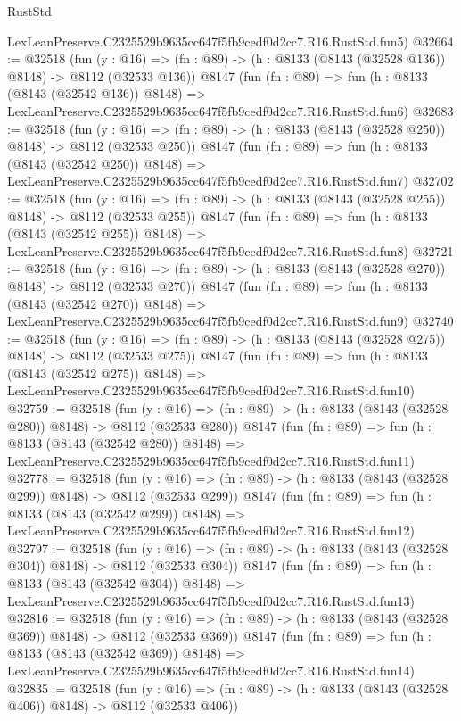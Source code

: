 \begin{lexlean}{RustStd}
\begin{coremodule}
    LexLeanPreserve.C2325529b9635cc647f5fb9cedf0d2cc7.R16.RustStd.fun5)
@32664 := @32518
    (fun (y : @16) => (fn : @89) -> (h : @8133 (@8143 (@32528 @136)) @8148) -> @8112 (@32533 @136))
    @8147
    (fun (fn : @89) =>
    fun (h : @8133 (@8143 (@32542 @136)) @8148) =>
    LexLeanPreserve.C2325529b9635cc647f5fb9cedf0d2cc7.R16.RustStd.fun6)
@32683 := @32518
    (fun (y : @16) => (fn : @89) -> (h : @8133 (@8143 (@32528 @250)) @8148) -> @8112 (@32533 @250))
    @8147
    (fun (fn : @89) =>
    fun (h : @8133 (@8143 (@32542 @250)) @8148) =>
    LexLeanPreserve.C2325529b9635cc647f5fb9cedf0d2cc7.R16.RustStd.fun7)
@32702 := @32518
    (fun (y : @16) => (fn : @89) -> (h : @8133 (@8143 (@32528 @255)) @8148) -> @8112 (@32533 @255))
    @8147
    (fun (fn : @89) =>
    fun (h : @8133 (@8143 (@32542 @255)) @8148) =>
    LexLeanPreserve.C2325529b9635cc647f5fb9cedf0d2cc7.R16.RustStd.fun8)
@32721 := @32518
    (fun (y : @16) => (fn : @89) -> (h : @8133 (@8143 (@32528 @270)) @8148) -> @8112 (@32533 @270))
    @8147
    (fun (fn : @89) =>
    fun (h : @8133 (@8143 (@32542 @270)) @8148) =>
    LexLeanPreserve.C2325529b9635cc647f5fb9cedf0d2cc7.R16.RustStd.fun9)
@32740 := @32518
    (fun (y : @16) => (fn : @89) -> (h : @8133 (@8143 (@32528 @275)) @8148) -> @8112 (@32533 @275))
    @8147
    (fun (fn : @89) =>
    fun (h : @8133 (@8143 (@32542 @275)) @8148) =>
    LexLeanPreserve.C2325529b9635cc647f5fb9cedf0d2cc7.R16.RustStd.fun10)
@32759 := @32518
    (fun (y : @16) => (fn : @89) -> (h : @8133 (@8143 (@32528 @280)) @8148) -> @8112 (@32533 @280))
    @8147
    (fun (fn : @89) =>
    fun (h : @8133 (@8143 (@32542 @280)) @8148) =>
    LexLeanPreserve.C2325529b9635cc647f5fb9cedf0d2cc7.R16.RustStd.fun11)
@32778 := @32518
    (fun (y : @16) => (fn : @89) -> (h : @8133 (@8143 (@32528 @299)) @8148) -> @8112 (@32533 @299))
    @8147
    (fun (fn : @89) =>
    fun (h : @8133 (@8143 (@32542 @299)) @8148) =>
    LexLeanPreserve.C2325529b9635cc647f5fb9cedf0d2cc7.R16.RustStd.fun12)
@32797 := @32518
    (fun (y : @16) => (fn : @89) -> (h : @8133 (@8143 (@32528 @304)) @8148) -> @8112 (@32533 @304))
    @8147
    (fun (fn : @89) =>
    fun (h : @8133 (@8143 (@32542 @304)) @8148) =>
    LexLeanPreserve.C2325529b9635cc647f5fb9cedf0d2cc7.R16.RustStd.fun13)
@32816 := @32518
    (fun (y : @16) => (fn : @89) -> (h : @8133 (@8143 (@32528 @369)) @8148) -> @8112 (@32533 @369))
    @8147
    (fun (fn : @89) =>
    fun (h : @8133 (@8143 (@32542 @369)) @8148) =>
    LexLeanPreserve.C2325529b9635cc647f5fb9cedf0d2cc7.R16.RustStd.fun14)
@32835 := @32518
    (fun (y : @16) => (fn : @89) -> (h : @8133 (@8143 (@32528 @406)) @8148) -> @8112 (@32533 @406))

\end{coremodule}
\end{lexlean}
